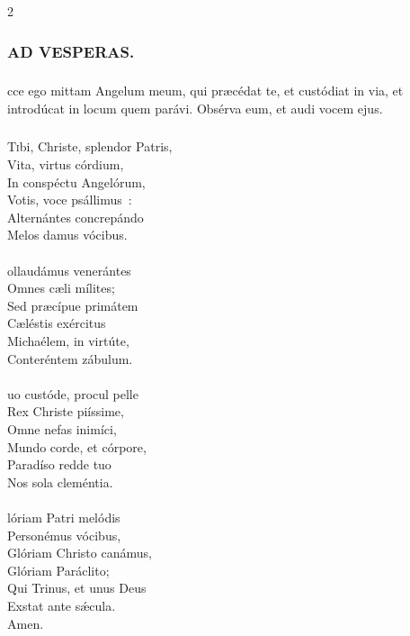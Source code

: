 \documentclass[9pt,twoside]{extarticle}
\begin{document}
\begin{multicols}{2}
{{{\subsubsection*{\center {}}


\subsubsection*{\center \textsc{AD VESPERAS.}}
\subsubsection*{}
cce ego mittam Angelum meum, qui præcédat te, et custódiat in via, et introdúcat in locum quem parávi. Obsérva eum, et audi vocem ejus.

\subsubsection*{\center {}}
\lettrine{T}ibi, Christe, splendor Patris,\\
Vita, virtus córdium,\\
In conspéctu Angelórum,\\
Votis, voce psállimus~:\\
Alternántes concrepándo\\
Melos damus vócibus.\\
\\
ollaudámus venerántes\\
Omnes cæli mílites;\\
Sed præcípue primátem\\
Cæléstis exércitus\\
Michaélem, in virtúte,\\
Conteréntem zábulum.\\
\\
uo custóde, procul pelle\\
Rex Christe piíssime,\\
Omne nefas inimíci,\\
Mundo corde, et córpore,\\
Paradíso redde tuo\\
Nos sola cleméntia.\\
\\
lóriam Patri melódis\\
Personémus vócibus,\\
Glóriam Christo canámus,\\
Glóriam Paráclito;\\
Qui Trinus, et unus Deus\\
Exstat ante sǽcula.\\
Amen.

}}}
\end{multicols}
\end{document}
